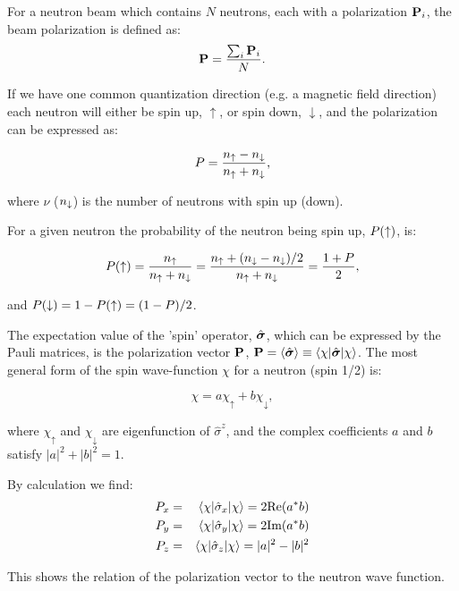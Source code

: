 For a neutron beam which contains $N$ neutrons, each with a
polarization $\mathbf{P}_i$, the beam polarization is defined as:
\begin{equation}
  \label{eq:pol_beam}
  \mathbf{P} = \frac{\sum_i \mathbf{P}_i}{N}.
\end{equation}

If we have one common quantization direction (e.g. a magnetic field
direction) each neutron will either be spin up, $\uparrow$, or spin down,
$\downarrow$, and the polarization can be expressed as:

\begin{equation}
  \label{eq:pol}
  P = \frac{n_\uparrow-n_\downarrow}{n_\uparrow+n_\downarrow},
\end{equation}

where $\nu$ ($n_\downarrow$) is the number of neutrons with spin up
(down).

For a given neutron the probability of the neutron being spin up, $P(\uparrow)$, is: 

\begin{equation}
  \label{eq:prob_spinup}
  P(\uparrow) = \frac{n_\uparrow}{n_\uparrow+n_\downarrow} = \frac{n_\uparrow + (n_\downarrow-n_\downarrow)/2}{n_\uparrow+n_\downarrow} 
  = \frac{1+P}{2},
\end{equation}

and $P(\downarrow) = 1-P(\uparrow) = (1-P)/2$. 

The expectation value of the 'spin' operator, $\hat{\mbox{\boldmath $\sigma$}}$, which can be
expressed by the Pauli matrices, is the polarization vector $\mathbf{P}$, $\mathbf{P} =
\langle \hat{\mbox{\boldmath $\sigma$}} \rangle \equiv \langle \chi | \hat{\mbox{\boldmath $\sigma$}} | \chi \rangle$.  The
most general form of the spin wave-function $\chi$ for a neutron (spin 1/2)
is:

\begin{equation}
  \label{eq:neutron_wave}
  \chi = a\chi_\uparrow + b\chi_\downarrow,
\end{equation}

where $\chi_\uparrow$ and $\chi_\downarrow$ are eigenfunction of
$\hat{\sigma}^z$, and the complex coefficients $a$ and $b$ satisfy
$|a|^2 + |b|^2 = 1$.

By calculation we find:
\begin{eqnarray}
P_x & = & \langle \chi | \hat{\sigma}_x | \chi \rangle
= 2 \text{Re}(a^\ast b) \\
P_y & = & \langle \chi | \hat{\sigma}_y | \chi \rangle
= 2 \text{Im}(a^\ast b) \\
P_z & = & \langle \chi | \hat{\sigma}_z | \chi \rangle
= |a|^2-|b|^2
\end{eqnarray}

This shows the relation of the polarization vector to the neutron wave
function. 

